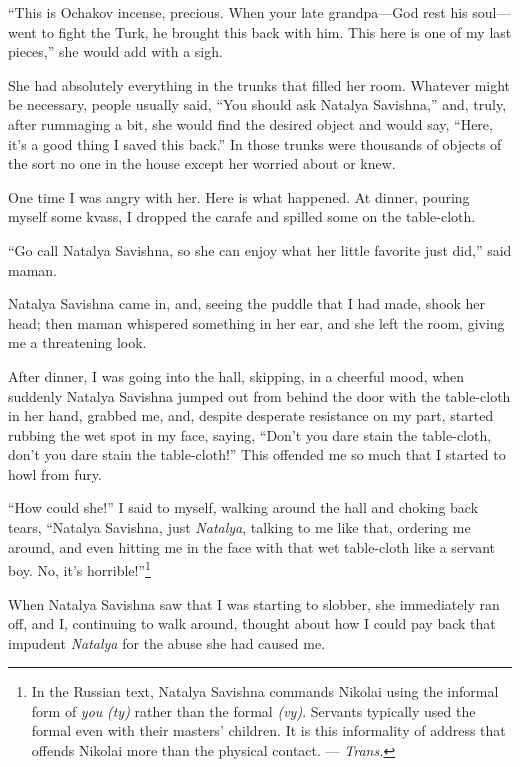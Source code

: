 ``This is Ochakov incense, precious. When your late grandpa---God rest his soul---went to fight the Turk, he brought this back with him. This here is one of my last pieces,'' she would add with a sigh. %

She had absolutely everything in the trunks that filled her room. Whatever might be necessary, people usually said, ``You should ask Natalya Savishna,'' and, truly, after rummaging a bit, she would find the desired object and would say, ``Here, it's a good thing I saved this back.'' In those trunks were thousands of objects of the sort no one in the house except her worried about or knew. %

One time I was angry with her. Here is what happened. At dinner, pouring myself some kvass, I dropped the carafe and spilled some on the table-cloth.

``Go call Natalya Savishna, so she can enjoy what her little favorite just did,'' said maman.

Natalya Savishna came in, and, seeing the puddle that I had made, shook her head; then maman whispered something in her ear, and she left the room, giving me a threatening look.

After dinner, I was going into the hall, skipping, in a cheerful mood, when suddenly Natalya Savishna jumped out from behind the door with the table-cloth in her hand, grabbed me, and, despite desperate resistance on my part, started rubbing the wet spot in my face, saying, ``Don't you dare stain the table-cloth, don't you dare stain the table-cloth!'' This offended me so much that I started to howl from fury. %

``How could she!'' I said to myself, walking around the hall and choking back tears, ``Natalya Savishna, just \emph{Natalya}, talking to me like that, ordering me around, and even hitting me in the face with that wet table-cloth like a servant boy. No, it's horrible!''\footnote{In the Russian text, Natalya Savishna commands Nikolai using the informal form of \textit{you} \textit{(ty)} rather than the formal \textit{(vy)}. Servants typically used the formal even with their masters' children. It is this informality of address that offends Nikolai more than the physical contact. --- \textit{Trans.}}

When Natalya Savishna saw that I was starting to slobber, she immediately ran off, and I, continuing to walk around, thought about how I could pay back that impudent \emph{Natalya} for the abuse she had caused me.

